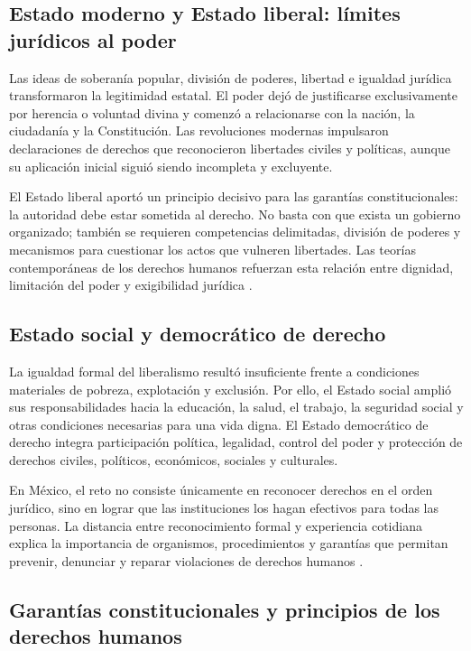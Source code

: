 \documentclass[
  spanish,
  letterpaper, oneside
]{article}
\begin{document}
\subsection{Estado moderno y Estado liberal: límites jurídicos al poder}

Las ideas de soberanía popular, división de poderes, libertad e igualdad jurídica transformaron la legitimidad estatal. El poder dejó de justificarse exclusivamente por herencia o voluntad divina y comenzó a relacionarse con la nación, la ciudadanía y la Constitución. Las revoluciones modernas impulsaron declaraciones de derechos que reconocieron libertades civiles y políticas, aunque su aplicación inicial siguió siendo incompleta y excluyente.

El Estado liberal aportó un principio decisivo para las garantías constitucionales: la autoridad debe estar sometida al derecho. No basta con que exista un gobierno organizado; también se requieren competencias delimitadas, división de poderes y mecanismos para cuestionar los actos que vulneren libertades. Las teorías contemporáneas de los derechos humanos refuerzan esta relación entre dignidad, limitación del poder y exigibilidad jurídica \citep{marcanoSalazarDerechosHumanos}.

\subsection{Estado social y democrático de derecho}

La igualdad formal del liberalismo resultó insuficiente frente a condiciones materiales de pobreza, explotación y exclusión. Por ello, el Estado social amplió sus responsabilidades hacia la educación, la salud, el trabajo, la seguridad social y otras condiciones necesarias para una vida digna. El Estado democrático de derecho integra participación política, legalidad, control del poder y protección de derechos civiles, políticos, económicos, sociales y culturales.

En México, el reto no consiste únicamente en reconocer derechos en el orden jurídico, sino en lograr que las instituciones los hagan efectivos para todas las personas. La distancia entre reconocimiento formal y experiencia cotidiana explica la importancia de organismos, procedimientos y garantías que permitan prevenir, denunciar y reparar violaciones de derechos humanos \citep{alvarezIcazaDerechosMexico}.

\subsection{Garantías constitucionales y principios de los derechos humanos}
\end{document}

